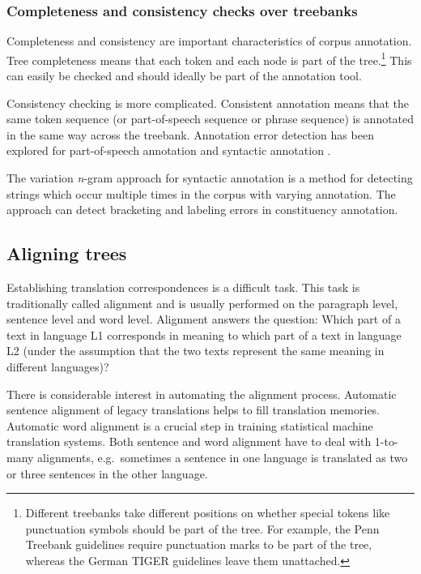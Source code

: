 \documentclass[output=paper]{LSP/langsci}
\begin{document}
\subsubsection{Completeness and consistency checks over treebanks}\label{sec:volk:2.1.2}

Completeness and consistency are important characteristics of corpus annotation. Tree completeness means that each token and each node is part of the tree.\footnote{Different treebanks take different positions on whether special tokens like punctuation symbols should be part of the tree. For example, the Penn Treebank guidelines require punctuation marks to be part of the tree, whereas the German TIGER guidelines leave them unattached.} This can easily be checked and should ideally be part of the annotation tool. 

Consistency checking is more complicated. Consistent annotation means that the same token sequence (or part-of-speech sequence or phrase sequence) is annotated in the same way across the treebank. Annotation error detection has been explored for part-of-speech annotation \citep{Dickinson2003a,Loftsson2009} and syntactic annotation \citep{Ule2004,Dickinson2005}. 

The variation \textit{n}{}-gram approach for syntactic annotation \citep{Dickinson2003b, Dickinson2005} is a method for detecting strings which occur multiple times in the corpus with varying annotation. The approach can detect bracketing and labeling errors in constituency annotation. 

\subsection{Aligning trees}\label{sec:volk:2.2}

Establishing translation correspondences is a difficult task. This task is traditionally called alignment and is usually performed on the paragraph level, sentence level and word level. Alignment answers the question: Which part of a text in language L1 corresponds in meaning to which part of a text in language L2 (under the assumption that the two texts represent the same meaning in different languages)? 

There is considerable interest in automating the alignment process. Automatic sentence alignment of legacy translations helps to fill translation memories. Automatic word alignment is a crucial step in training statistical machine translation systems. Both sentence and word alignment have to deal with 1-to-many alignments, e.g.~sometimes a sentence in one language is translated as two or three sentences in the other language. 
\end{document}
